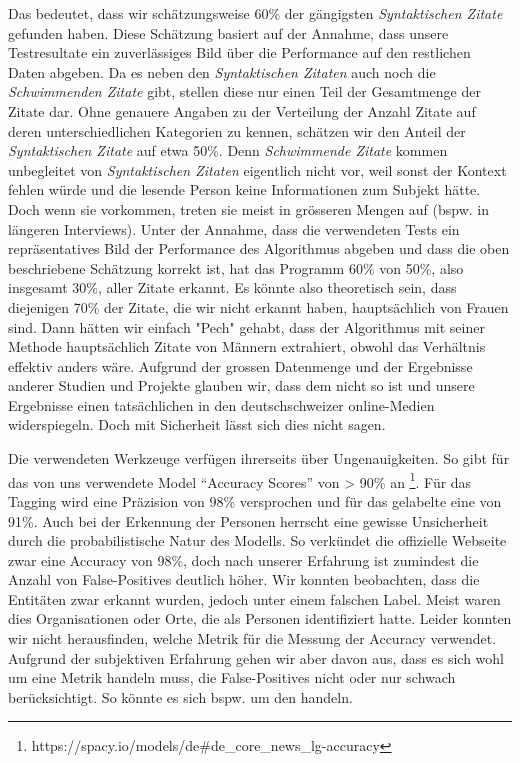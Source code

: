 Das bedeutet, dass wir schätzungsweise 60\% der gängigsten \textsl{Syntaktischen Zitate} gefunden haben. Diese Schätzung
basiert auf der Annahme, dass unsere Testresultate ein zuverlässiges Bild über die Performance auf den
restlichen Daten abgeben. Da es neben den \textsl{Syntaktischen Zitaten} auch noch die \textsl{Schwimmenden Zitate} gibt,
stellen diese nur einen Teil der Gesamtmenge der Zitate dar.
Ohne genauere Angaben zu der Verteilung der Anzahl Zitate auf deren
unterschiedlichen Kategorien zu kennen, schätzen wir den Anteil der \textsl{Syntaktischen Zitate} auf etwa 50\%.
Denn \textsl{Schwimmende Zitate} kommen unbegleitet von \textsl{Syntaktischen Zitaten} eigentlich nicht vor,
weil sonst der Kontext fehlen würde und die lesende Person keine Informationen zum Subjekt hätte.
Doch wenn sie vorkommen, treten sie meist in grösseren Mengen auf (bspw. in längeren Interviews).
Unter der Annahme, dass die verwendeten Tests ein repräsentatives Bild der Performance
des Algorithmus abgeben und dass die oben beschriebene Schätzung korrekt ist, hat das Programm
60\% von 50\%, also insgesamt 30\%, aller Zitate erkannt.
Es könnte also theoretisch sein, dass diejenigen 70\% der Zitate, die wir nicht erkannt haben, hauptsächlich von
Frauen sind. Dann hätten wir einfach "Pech" gehabt, dass der Algorithmus mit seiner Methode hauptsächlich Zitate
von Männern extrahiert, obwohl das Verhältnis effektiv anders wäre.
Aufgrund der grossen Datenmenge und der
Ergebnisse anderer Studien und Projekte glauben wir, dass dem nicht so ist und unsere Ergebnisse einen tatsächlichen
 in den deutschschweizer online-Medien widerspiegeln.
Doch mit Sicherheit lässt sich dies nicht sagen.

Die verwendeten Werkzeuge verfügen ihrerseits über Ungenauigkeiten. So gibt  für das
von uns verwendete Model \enquote{Accuracy Scores} von > 90\% an \footnote{https://spacy.io/models/de\#de\_core\_news\_lg-accuracy}.
Für das  Tagging wird eine Präzision von 98\% versprochen und für das gelabelte 
 eine von 91\%.
Auch bei der Erkennung der Personen herrscht eine gewisse Unsicherheit durch die
probabilistische Natur des  Modells. So verkündet die offizielle Webseite zwar
eine Accuracy von 98\%, doch nach unserer Erfahrung ist zumindest die Anzahl von False-Positives
deutlich höher. Wir konnten beobachten, dass die Entitäten
zwar erkannt wurden, jedoch unter einem falschen Label. Meist waren dies Organisationen oder Orte,
die  als Personen identifiziert hatte. Leider konnten wir nicht herausfinden,
welche Metrik  für die Messung der Accuracy verwendet. Aufgrund der subjektiven
Erfahrung gehen wir aber davon aus, dass es sich wohl um eine Metrik handeln muss, die
False-Positives nicht oder nur schwach berücksichtigt. So könnte es sich bspw. um den 
handeln.


